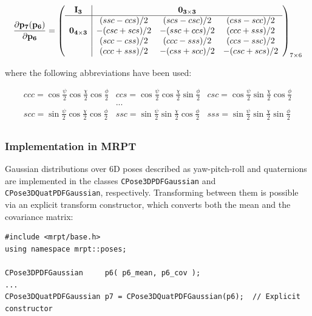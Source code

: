 \documentclass[a4paper,11pt]{report}
\begin{document}
\begin{equation}
\label{eq:jac_p7_p6}
\frac{\partial \mathbf{p_7}(\mathbf{p_6}) }{\partial \mathbf{p_6}} =
\left(
\begin{array}{c|cccc}
 \mathbf{I_3} & & \mathbf{0_{3\times 3}} & \\ \hline
  & (ssc-ccs)/2 & (scs-csc)/2 & (css-scc)/2 \\
 \mathbf{0_{4\times 3}}
  & -(csc+scs)/2 & -(ssc+ccs)/2 & (ccc+sss)/2 \\
  & (scc-css)/2 & (ccc-sss)/2 & (ccs-ssc)/2 \\ 
  & (ccc+sss)/2 & -(css+scc)/2 & -(csc+scs)/2 \\ 
\end{array}
\right)_{7 \times 6}
\end{equation}

\noindent where the following abbreviations have been used:

\begin{equation*}
\begin{array}{ccc}
ccc = \cos\frac{\psi}{2}\cos\frac{\chi}{2}\cos\frac{\phi}{2}  & 
ccs = \cos\frac{\psi}{2}\cos\frac{\chi}{2}\sin\frac{\phi}{2}  & 
csc = \cos\frac{\psi}{2}\sin\frac{\chi}{2}\cos\frac{\phi}{2}  \\
 & ... & \\
scc = \sin\frac{\psi}{2}\cos\frac{\chi}{2}\cos\frac{\phi}{2}  & 
ssc = \sin\frac{\psi}{2}\sin\frac{\chi}{2}\cos\frac{\phi}{2}  & 
sss = \sin\frac{\psi}{2}\sin\frac{\chi}{2}\sin\frac{\phi}{2}  \\
\end{array}
\end{equation*}



\subsubsection{Implementation in MRPT}

Gaussian distributions over 6D poses described as yaw-pitch-roll and quaternions 
are implemented in the classes \texttt{CPose3DPDFGaussian} and \texttt{CPose3DQuatPDFGaussian}, respectively.
Transforming between them is possible via an explicit transform constructor, which 
converts both the mean and the covariance matrix:

\begin{lstlisting}
#include <mrpt/base.h> 
using namespace mrpt::poses; 

CPose3DPDFGaussian     p6( p6_mean, p6_cov ); 
...
CPose3DQuatPDFGaussian p7 = CPose3DQuatPDFGaussian(p6);  // Explicit constructor
\end{lstlisting}
\end{document}
